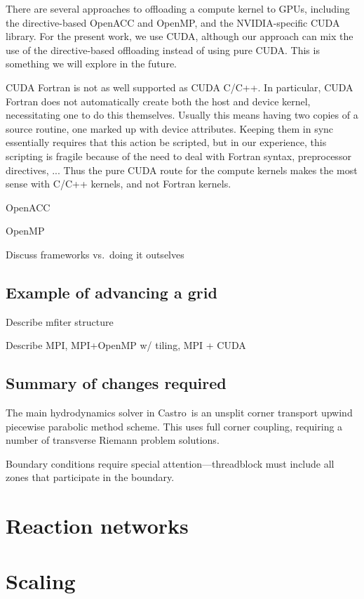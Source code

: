 \documentclass[twocolumn,times]{aastex62}
\newcommand{\castro}{{\sf Castro}}
\begin{document}
There are several approaches to offloading a compute kernel to GPUs,
including the directive-based OpenACC and OpenMP, and the
NVIDIA-specific CUDA library.  For the present work, we use CUDA,
although our approach can mix the use of the directive-based
offloading instead of using pure CUDA.  This is something we will
explore in the future.  

CUDA Fortran is not as well supported as CUDA C/C++.  In particular,
CUDA Fortran does not automatically create both the host and device
kernel, necessitating one to do this themselves.  Usually this means
having two copies of a source routine, one marked up with device
attributes.  Keeping them in sync essentially requires that this
action be scripted, but in our experience, this scripting is fragile
because of the need to deal with Fortran syntax, preprocessor
directives, ...  Thus the pure CUDA route for the compute kernels makes the most sense
with C/C++ kernels, and not Fortran kernels.

OpenACC


OpenMP

Discuss frameworks vs.\ doing it outselves




\subsection{Example of advancing a grid}

Describe mfiter structure

Describe MPI, MPI+OpenMP w/ tiling, MPI + CUDA


\subsection{Summary of changes required}

The main hydrodynamics solver in \castro\ is an unsplit corner
transport upwind \citep{ppmunsplit} piecewise parabolic method
\citep{ppm} scheme.  This uses full corner coupling, requiring a
number of transverse Riemann problem solutions.


Boundary conditions require special attention---threadblock must include
all zones that participate in the boundary.

\section{Reaction networks}

\section{Scaling}
\end{document}
